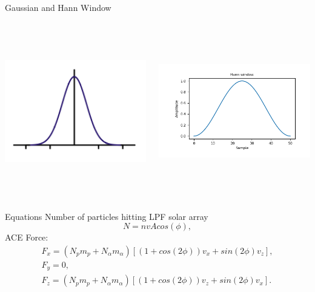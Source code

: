 \documentclass[aspectratio=169,xcolor=dvipsnames]{beamer}
\begin{document}
\begin{frame}{Gaussian and Hann Window}
\begin{columns}[t]
    \begin{column}{6cm}
    \includegraphics[height=7cm, width=7cm]{gaussian.png}
    \end{column}
    \begin{column}{7cm}
    \includegraphics[height=7cm, width=7.5cm]{hann.png}
    \end{column}
\end{columns}
\end{frame}
\begin{frame}{Equations}
Number of particles hitting LPF solar array
\begin{equation}\label{eq:Hanning Window}
N=n v Acos(\phi),
\end{equation}
ACE Force:
\begin{equation}\label{eq:Hanning Window}
\begin{split}
F_{x}=(N_{p}m_{p}+N_{\alpha}m_{\alpha})[(1+cos(2\phi))v_{x}+sin(2\phi)v_{z}], \\ F_{y}=0, \\ F_{z}=(N_{p}m_{p}+N_{\alpha}m_{\alpha})[(1+cos(2\phi))v_{z}+sin(2\phi)v_{x}].
\end{split}
\end{equation}
\end{frame}
\end{document}
